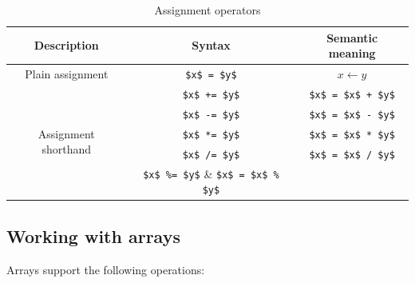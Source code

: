 \documentclass[UdineBachThesis,american,11pt]{PhdThesis}
\begin{document}
  \begin{table}[h]
    \centering

    \begin{tabular}{|c|c|c|}
      \hline

      Description &
      Syntax &
      Semantic meaning \\
      \hline

      Plain assignment &
      \lstinline[mathescape]@$x$ = $y$@ &
      $x \leftarrow y$ \\

      \multirow{5}{*}{Assignment shorthand} &
      \lstinline[mathescape]@$x$ += $y$@ &
      \lstinline[mathescape]@$x$ = $x$ + $y$@ \\

      &
      \lstinline[mathescape]@$x$ -= $y$@ &
      \lstinline[mathescape]@$x$ = $x$ - $y$@ \\

      &
      \lstinline[mathescape]@$x$ *= $y$@ &
      \lstinline[mathescape]@$x$ = $x$ * $y$@ \\

      &
      \lstinline[mathescape]@$x$ /= $y$@ &
      \lstinline[mathescape]@$x$ = $x$ / $y$@ \\

      &
      \lstinline[mathescape]@$x$ %= $y$@ &
      \lstinline[mathescape]@$x$ = $x$ % $y$@ \\
      \hline
    \end{tabular}

    \caption{Assignment operators}
    \label{table:assignment-operators}
  \end{table}

  \newpage

  \subsection{Working with arrays}

  Arrays support the following operations:
\end{document}

